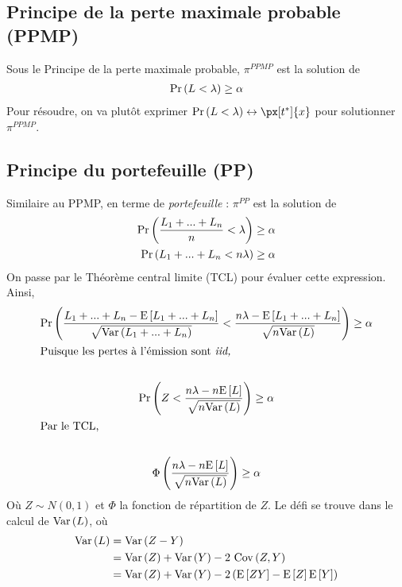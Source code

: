 \documentclass[10pt, french]{article}
\begin{document}
\begin{multicols*}{3}
\subsection{Principe de la perte maximale probable (PPMP)}
Sous le Principe de la perte maximale probable, $\pi^{PPMP}$ est la solution de
\begin{align*}
\Pr \left( L < \lambda \right) \geq \alpha
\end{align*}
Pour résoudre, on va plutôt exprimer $\prob{L < \lambda} \leftrightarrow \px[t^*]{x}$ pour solutionner $\pi^{PPMP}$.


\subsection{Principe du portefeuille (PP)}
Similaire au PPMP, en terme de \emph{portefeuille} : $\pi^{PP}$ est la solution de
\begin{align*}
\Pr \left( \frac{L_1 + ... + L_n}{n} < \lambda \right) &  \geq \alpha \\
\Pr \left( L_1 + ... + L_n < n \lambda \right) & \geq \alpha \\
\end{align*}
On passe par le Théorème central limite (TCL) pour évaluer cette expression. Ainsi,
\begin{gather*}
\Pr \left( \frac{L_1 + ... + L_n - \mathrm{E} \left[ L_1 + ... + L_n \right]}{\sqrt{\mathrm{Var} \left( L_1 + ... + L_n \right)}} < \frac{n \lambda - \mathrm{E} \left[ L_1 + ... + L_n \right]}{\sqrt{n \mathrm{Var} \left( L \right)}}   \right)  \geq \alpha \\
\shortintertext{Puisque les pertes à l'émission sont \emph{iid,}} \\
\Pr \left( Z < \frac{n \lambda - n \mathrm{E} \left[ L \right]}{\sqrt{n \mathrm{Var} \left( L \right)}} \right)  \geq \alpha \\
\shortintertext{Par le TCL,} \\
\Phi \left( \frac{n \lambda - n \mathrm{E} \left[ L \right]}{\sqrt{n \mathrm{Var} \left( L \right)}} \right)  \geq \alpha \\
\end{gather*}
Où $Z \sim N(0,1)$ et $\Phi$ la fonction de répartition de $Z$. Le défi se trouve dans le calcul de $\mathrm{Var} \left( L \right)$, où
\begin{align*}
\mathrm{Var} \left( L \right)	& = \mathrm{Var} \left( Z - Y \right) \\
& = \mathrm{Var} \left( Z \right) + \mathrm{Var} \left( Y \right) - 2 \  \mathrm{Cov} \left( Z, Y \right) \\
& = \mathrm{Var} \left( Z \right)  + \mathrm{Var} \left( Y \right) - 2 \left( \mathrm{E} \left[ ZY \right] - \mathrm{E} \left[ Z \right] \mathrm{E} \left[ Y \right] \right) \\
\end{align*}


\end{multicols*}
\end{document}
